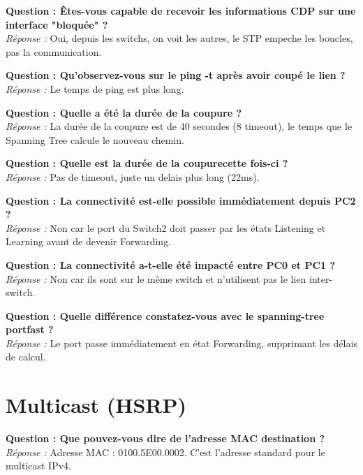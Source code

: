\documentclass[a4paper,12pt]{article}
\begin{document}
\textbf{Question : Êtes-vous capable de recevoir les informations CDP sur une interface "bloquée" ?} \\
\textit{Réponse :} Oui, depuis les switchs, on voit les autres, le STP empeche les boucles, pas la communication.
\vspace{1em}

\textbf{Question : Qu'observez-vous sur le ping -t après avoir coupé le lien ?} \\
\textit{Réponse :} Le temps de ping est plus long.
\vspace{1em}

\textbf{Question : Quelle a été la durée de la coupure ?} \\
\textit{Réponse :} La durée de la coupure est de 40 secondes (8 timeout), le temps que le Spanning Tree calcule le nouveau chemin.
\vspace{1em}

\textbf{Question : Quelle est la durée de la coupurecette fois-ci ?} \\
\textit{Réponse : } Pas de timeout, juste un delais plus long (22ms).
\vspace{1em}

\textbf{Question : La connectivité est-elle possible immédiatement depuis PC2 ?} \\
\textit{Réponse :} Non car le port du Switch2 doit passer par les états Listening et Learning avant de devenir Forwarding.
\vspace{1em}

\textbf{Question : La connectivité a-t-elle été impacté entre PC0 et PC1 ?} \\
\textit{Réponse :} Non car ils sont sur le même switch et n'utilisent pas le lien inter-switch.
\vspace{1em}

\textbf{Question : Quelle différence constatez-vous avec le spanning-tree portfast ?} \\
\textit{Réponse :} Le port passe immédiatement en état Forwarding, supprimant les délais de calcul.
\vspace{1em}

\section{Multicast (HSRP)}

\textbf{Question : Que pouvez-vous dire de l'adresse MAC destination ?} \\
\textit{Réponse :} Adresse MAC : 0100.5E00.0002. C'est l'adresse standard pour le multicast IPv4.
\vspace{1em}
\end{document}
